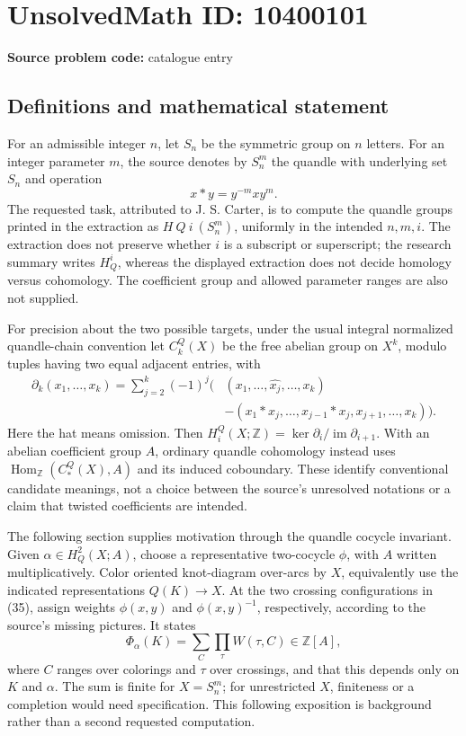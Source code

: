 \documentclass[11pt]{article}
\newcommand{\Z}{\mathbb{Z}}
\begin{document}
\section*{UnsolvedMath ID: 10400101}
\textbf{Source problem code:} catalogue entry
\subsection{Definitions and mathematical statement}
For an admissible integer \(n\), let \(S_n\) be the symmetric group on \(n\) letters. For an integer parameter \(m\), the source denotes by \(S_n^m\) the quandle with underlying set \(S_n\) and operation
\[x*y=y^{-m}xy^m.\]
The requested task, attributed to J. S. Carter, is to compute the quandle groups printed in the extraction as \(H\ Q\ i\ (S_n^m)\), uniformly in the intended \(n,m,i\). The extraction does not preserve whether \(i\) is a subscript or superscript; the research summary writes \(H_Q^i\), whereas the displayed extraction does not decide homology versus cohomology. The coefficient group and allowed parameter ranges are also not supplied.

For precision about the two possible targets, under the usual integral normalized quandle-chain convention let \(C_k^Q(X)\) be the free abelian group on \(X^k\), modulo tuples having two equal adjacent entries, with
\[\begin{split}
\partial_k(x_1,\ldots,x_k)=\sum_{j=2}^k(-1)^j\bigl(& (x_1,\ldots,\widehat{x_j},\ldots,x_k)\\
 &-(x_1*x_j,\ldots,x_{j-1}*x_j,x_{j+1},\ldots,x_k)\bigr).
\end{split}\]
Here the hat means omission. Then \(H_i^Q(X;\Z)=\ker\partial_i/\operatorname{im}\partial_{i+1}\). With an abelian coefficient group \(A\), ordinary quandle cohomology instead uses \(\operatorname{Hom}_{\Z}(C_*^Q(X),A)\) and its induced coboundary. These identify conventional candidate meanings, not a choice between the source's unresolved notations or a claim that twisted coefficients are intended.

The following section supplies motivation through the quandle cocycle invariant. Given \(\alpha\in H_Q^2(X;A)\), choose a representative two-cocycle \(\phi\), with \(A\) written multiplicatively. Color oriented knot-diagram over-arcs by \(X\), equivalently use the indicated representations \(Q(K)\to X\). At the two crossing configurations in (35), assign weights \(\phi(x,y)\) and \(\phi(x,y)^{-1}\), respectively, according to the source's missing pictures. It states
\[\Phi_\alpha(K)=\sum_C\prod_\tau W(\tau,C)\in\Z[A],\]
where \(C\) ranges over colorings and \(\tau\) over crossings, and that this depends only on \(K\) and \(\alpha\). The sum is finite for \(X=S_n^m\); for unrestricted \(X\), finiteness or a completion would need specification. This following exposition is background rather than a second requested computation.
\end{document}
